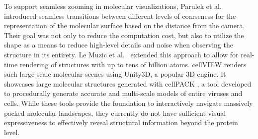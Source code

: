 \documentclass{egpubl}
\begin{document}
	To support seamless zooming in molecular visualizations, Parulek et al.~\cite{parulek2014continuous} introduced seamless transitions between different levels of coarseness for the representation of the molecular surface based on the distance from the camera.
	Their goal was not only to reduce the computation cost, but also to utilize the shape as a means to reduce high-level details and noise when observing the structure in its entirety.
	Le Muzic et al.~\cite{le2014illustrative} extended this approach to allow for real-time rendering of structures with up to tens of billion atoms. %
	cellVIEW \cite{muzic2015cellview} renders such large-scale molecular scenes using Unity3D, a popular 3D engine. 
	It showcases large molecular structures generated with cellPACK \cite{johnson2015cellpack}, a tool developed to procedurally generate accurate and multi-scale models of entire viruses and cells.
	While these tools provide the foundation to interactively navigate massively packed molecular landscapes, they currently do not have sufficient visual expressiveness to effectively reveal structural information beyond the protein level. 
\end{document}

